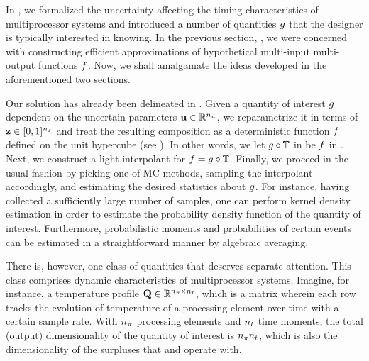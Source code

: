 In , we formalized the uncertainty affecting the timing
characteristics of multiprocessor systems and introduced a number of quantities
$g$ that the designer is typically interested in knowing. In the previous
section, , we were concerned with constructing efficient
approximations of hypothetical multi-input multi-output functions $f$. Now, we
shall amalgamate the ideas developed in the aforementioned two sections.

Our solution has already been delineated in . Given a quantity of
interest $g$ dependent on the uncertain parameters $\mathbf{u} \in \mathbb{R}^{n_u}$, we
reparametrize it in terms of $\mathbf{z} \in [0, 1]^{n_z}$ and treat the resulting
composition as a deterministic function $f$ defined on the unit hypercube (see
). In other words, we let $g \circ \mathbb{T}$
in  be $f$ in . Next, we construct a light
interpolant for $f = g \circ \mathbb{T}$. Finally, we proceed in the
usual  fashion by picking one of MC methods, sampling the interpolant
accordingly, and estimating the desired statistics about $g$. For instance,
having collected a sufficiently large number of samples, one can perform kernel
density estimation in order to estimate the probability density function of the
quantity of interest. Furthermore, probabilistic moments and probabilities of
certain events can be estimated in a straightforward manner by algebraic
averaging.

There is, however, one class of quantities that deserves separate attention.
This class comprises dynamic characteristics of multiprocessor systems. Imagine,
for instance, a temperature profile $\mathbf{Q} \in \mathbb{R}^{{n_\pi} \times {n_t}}$, which is a
matrix wherein each row tracks the evolution of temperature of a processing
element over time with a certain sample rate. With ${n_\pi}$ processing elements and
${n_t}$ time moments, the total (output) dimensionality of the quantity of
interest is ${n_\pi}{n_t}$, which is also the dimensionality of the surpluses that
 and  operate with.
